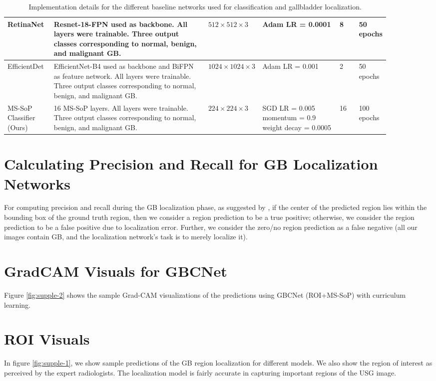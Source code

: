 \documentclass[10pt,twocolumn,letterpaper]{article}
\begin{document}
\begin{table*}[ht]
{\begin{tabular}{p{0.12\linewidth}p{0.4\linewidth}p{0.06\linewidth}p{0.2\linewidth}p{0.05\linewidth}p{0.06\linewidth}}
RetinaNet \cite{retinanet} & Resnet-18-FPN used as backbone. All layers were trainable. Three output classes corresponding to normal, benign, and malignant GB. & $512\times512\times3$ & Adam LR = 0.0001 & 8 & 50 epochs \\ \hline
EfficientDet \cite{efficientdet} & EfficientNet-B4 used as backbone and BiFPN as feature network. All layers were trainable. Three output classes corresponding to normal, benign, and malignant GB. & $1024\times1024\times3$ & Adam LR = 0.001 & 2 & 50 epochs \\ \hline
MS-SoP Classifier (Ours) & 16 MS-SoP layers. All layers were trainable. Three output classes corresponding to normal, benign, and malignant GB. & $224\times224\times3$ & SGD LR = 0.005 momentum = 0.9 weight decay = 0.0005 & 16 & 100 epochs \\
\bottomrule
\end{tabular}
}
\caption{Implementation details for the different baseline networks used for classification and gallbladder localization.}
\label{tbl:configs}
\end{table*}

\section{Calculating Precision and Recall for GB Localization Networks}
\label{supp:eval_metric}
For computing precision and recall during the GB localization phase, as suggested by \cite{ribli2018detecting}, if the center of the predicted region lies within the bounding box of the ground truth region, then we consider a region prediction to be a true positive; otherwise, we consider the region prediction to be a false positive due to localization error. Further, we consider the zero/no region prediction as a false negative (all our images contain GB, and the localization network's task is to merely localize it). 

\section{GradCAM Visuals for GBCNet}
\label{supp:cam_vis}
Figure \ref{fig:supple-2} shows the sample Grad-CAM visualizations of the predictions using GBCNet (ROI+MS-SoP) with curriculum learning. 

\section{ROI Visuals}
\label{supp:roi_vis}
In figure \ref{fig:supple-1}, we show sample predictions of the GB region localization for different models. We also show the region of interest as perceived by the expert radiologists. The localization model is fairly accurate in capturing important regions of the USG image.
\end{document}
